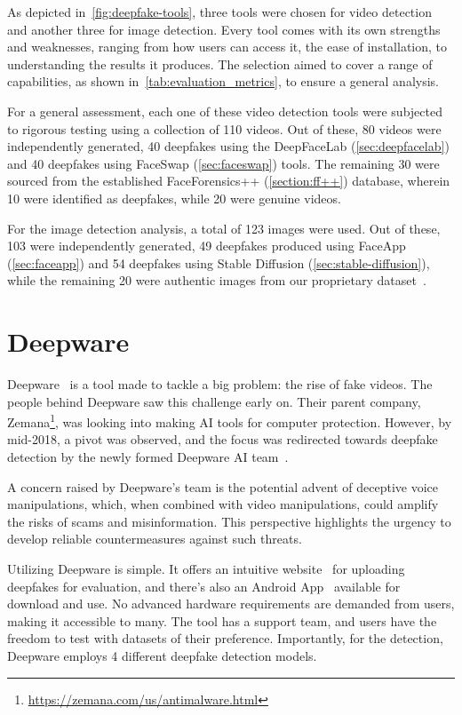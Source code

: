 As depicted in~\autoref{fig:deepfake-tools}, three tools were chosen for video
detection and another three for image detection. Every tool comes with its own
strengths and weaknesses, ranging from how users can access it, the ease of
installation, to understanding the results it produces. The selection aimed to
cover a range of capabilities, as shown in~\autoref{tab:evaluation_metrics},
to ensure a general analysis.

For a general assessment, each one of these video detection tools were subjected
to rigorous testing using a collection of 110 videos. Out of these, 80 videos were independently
generated, 40 deepfakes using the DeepFaceLab (\autoref{sec:deepfacelab}) and 40
deepfakes using FaceSwap (\autoref{sec:faceswap}) tools. The remaining 30 were sourced
from the established FaceForensics++ (\autoref{section:ff++})
database, wherein 10 were identified as deepfakes, while 20 were genuine videos.

For the image detection analysis, a total of 123 images were used. Out of
these, 103 were independently generated, 49 deepfakes produced using FaceApp (\autoref{sec:faceapp})
and 54 deepfakes using Stable Diffusion (\autoref{sec:stable-diffusion}), while the
remaining 20 were authentic images from our proprietary dataset~\cite{my-github-dataset}.

\section{Deepware}\label{sec:deepware}
Deepware~\cite{deepware-ai} is a tool made to tackle a big
problem: the rise of fake videos. The people behind
Deepware saw this challenge early on. Their parent company,
Zemana\footnote{\url{https://zemana.com/us/antimalware.html}},
was looking into making \ac{AI} tools for computer protection. However,
by mid-2018, a pivot was observed, and the focus was redirected towards
deepfake detection by the newly formed Deepware \ac{AI} team~\cite{deepware-ai-about}.

A concern raised by Deepware's team is the potential advent of deceptive
voice manipulations, which, when combined with video manipulations, could
amplify the risks of scams and misinformation. This perspective highlights
the urgency to develop reliable countermeasures against such threats.

Utilizing Deepware is simple. It offers an intuitive website~\cite{deepware-ai} for uploading
deepfakes for evaluation, and there's also an Android App~\cite{deepware-android-app}
available for download and use. No advanced hardware requirements are demanded from users,
making it accessible to many. The tool has a support team, and users have
the freedom to test with datasets of their preference. Importantly,
for the detection, Deepware employs 4 different deepfake detection models.

